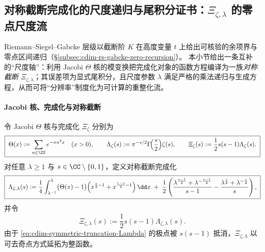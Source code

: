 \subsection{对称截断完成化的尺度递归与尾积分证书：\texorpdfstring{$\Xi_{\zeta,\lambda}$}{Xi(zeta,lambda)} 的零点尺度流}\label{subsec:cdim-symmetric-truncation-scale-flow}
Riemann--Siegel--Gabcke 层级以截断阶 \(K\) 在高度变量 \(t\) 上给出可核验的余项界与零点区间递归（\S\ref{subsec:cdim-rs-gabcke-zero-recursion}）。
本小节给出一条互补的“尺度轴”：利用 Jacobi \(\Theta\) 核的模变换把完成化对象的函数方程编译为一族\emph{对称截断} \(\Xi_{\zeta,\lambda}\)；其误差项为显式尾积分，且尺度参数 \(\lambda\) 满足严格的乘法递归与生成方程，从而可将“分辨率”制度化为可计算的重整化流。

\paragraph{Jacobi 核、完成化与对称截断}
令 Jacobi \(\Theta\) 核与完成化 \(\Xi_\zeta\) 分别为
\begin{equation}\label{eq:cdim-jacobi-theta-and-xi}
\boxed{\;
\Theta(x):=\sum_{n\in\ZZ}e^{-\pi n^2x}\quad(x>0),\qquad
\Lambda_\zeta(s):=\pi^{-s/2}\Gamma\!\Bigl(\frac{s}{2}\Bigr)\zeta(s),\qquad
\Xi_\zeta(s):=\frac12 s(s-1)\Lambda_\zeta(s).\;}
\end{equation}
对任意 \(\lambda\ge 1\) 与 \(s\in\CC\setminus\{0,1\}\)，定义对称截断完成化
\begin{equation}\label{eq:cdim-symmetric-truncation-Lambda}
\boxed{\;
\Lambda_{\zeta,\lambda}(s)
:=\frac14\int_{\lambda^{-1}}^{\lambda}\bigl(\Theta(x)-1\bigr)
\Bigl(x^{\frac{s}{2}-1}+x^{\frac{1-s}{2}-1}\Bigr)\,\dd x
\;+\;\frac12\left(
\frac{\lambda^{\frac{s-1}{2}}+\lambda^{-\frac{s-1}{2}}}{s-1}
-\frac{\lambda^{\frac{s}{2}}+\lambda^{-\frac{s}{2}}}{s}
\right),\;}
\end{equation}
并令
\begin{equation}\label{eq:cdim-symmetric-truncation-Xi}
\boxed{\;
\Xi_{\zeta,\lambda}(s):=\frac12 s(s-1)\Lambda_{\zeta,\lambda}(s).\;}
\end{equation}
由于 \eqref{eq:cdim-symmetric-truncation-Lambda} 的极点被 \(s(s-1)\) 抵消，\(\Xi_{\zeta,\lambda}\) 以可去奇点方式延拓为整函数。

